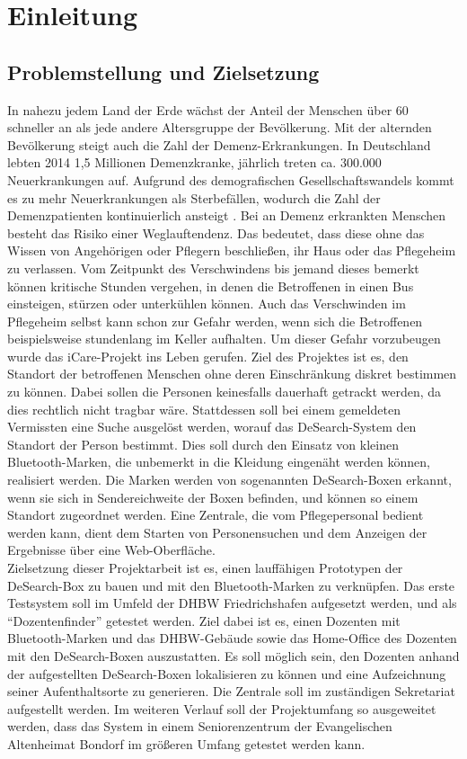 
\section{Einleitung}

\subsection{Problemstellung und Zielsetzung}
In nahezu jedem Land der Erde wächst der Anteil der Menschen über 60 schneller an als jede andere Altersgruppe der Bevölkerung. Mit der alternden Bevölkerung steigt auch die Zahl der Demenz-Erkrankungen. In Deutschland lebten 2014 1,5 Millionen Demenzkranke, jährlich treten ca. 300.000 Neuerkrankungen auf. Aufgrund des demografischen Gesellschaftswandels kommt es zu mehr Neuerkrankungen als Sterbefällen, wodurch die Zahl der Demenzpatienten kontinuierlich ansteigt \citep[Vgl.][]{demenz}.
Bei an Demenz erkrankten Menschen besteht das Risiko einer Weglauftendenz. Das bedeutet, dass diese ohne das Wissen von Angehörigen oder Pflegern beschließen, ihr Haus oder das Pflegeheim zu verlassen. Vom Zeitpunkt des Verschwindens bis jemand dieses bemerkt können kritische Stunden vergehen, in denen die Betroffenen in einen Bus einsteigen, stürzen oder unterkühlen können. Auch das Verschwinden im Pflegeheim selbst kann schon zur Gefahr werden, wenn sich die Betroffenen beispielsweise stundenlang im Keller aufhalten. Um dieser Gefahr vorzubeugen wurde das iCare-Projekt ins Leben gerufen. Ziel des Projektes ist es, den Standort der betroffenen Menschen ohne deren Einschränkung diskret bestimmen zu können. Dabei sollen die Personen keinesfalls dauerhaft getrackt werden, da dies rechtlich nicht tragbar wäre. Stattdessen soll bei einem gemeldeten Vermissten eine Suche ausgelöst werden, worauf das DeSearch-System den Standort der Person bestimmt. Dies soll durch den Einsatz von kleinen Bluetooth-Marken, die unbemerkt in die Kleidung eingenäht werden können, realisiert werden. Die Marken werden von sogenannten DeSearch-Boxen erkannt, wenn sie sich in Sendereichweite der Boxen befinden, und können so einem Standort zugeordnet werden. Eine Zentrale, die vom Pflegepersonal bedient werden kann, dient dem Starten von Personensuchen und dem Anzeigen der Ergebnisse über eine Web-Oberfläche.
\\Zielsetzung dieser Projektarbeit ist es, einen lauffähigen Prototypen der DeSearch-Box zu bauen und mit den Bluetooth-Marken zu verknüpfen. Das erste Testsystem soll im Umfeld der DHBW Friedrichshafen aufgesetzt werden, und als “Dozentenfinder” getestet werden. Ziel dabei ist es, einen Dozenten mit Bluetooth-Marken und das DHBW-Gebäude sowie das Home-Office des Dozenten mit den DeSearch-Boxen auszustatten. Es soll möglich sein, den Dozenten anhand der aufgestellten DeSearch-Boxen lokalisieren zu können und eine Aufzeichnung seiner Aufenthaltsorte zu generieren. Die Zentrale soll im zuständigen Sekretariat aufgestellt werden.
Im weiteren Verlauf soll der Projektumfang so ausgeweitet werden, dass das System in einem Seniorenzentrum der Evangelischen Altenheimat Bondorf im größeren Umfang getestet werden kann.




